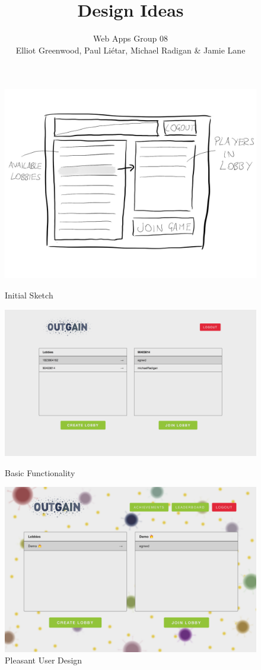 \documentclass[a4paper, 6pt]{article}
\title{Design Ideas}
\author{Web Apps Group 08 \\ Elliot Greenwood, Paul Li\'etar, Michael Radigan \& Jamie Lane}
\date{}
\begin{document}
\maketitle

\begin{figure}[ht!]
\includegraphics[width=\linewidth]{lobbies_01.jpg}
\caption{Initial Sketch}
\endminipage\hfill
{}
\includegraphics[width=\linewidth]{lobbies_02.png}
\caption{Basic Functionality}
\endminipage\hfill
{}
\includegraphics[width=\linewidth]{lobbies_03.png}
\caption{Pleasant User Design}
\endminipage\hfill
\end{figure}
\end{document}
